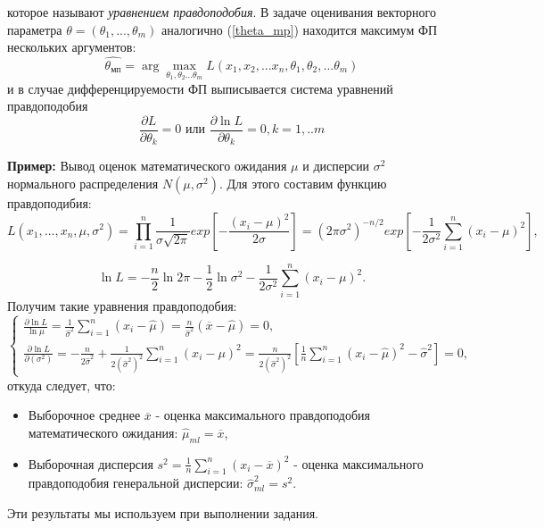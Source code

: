 \documentclass[../body.tex]{subfiles}
\begin{document}
которое называют \textit{уравнением правдоподобия}.
В задаче оценивания векторного параметра $\theta = (\theta_{1}, ... ,\theta_{m})$ аналогично (\ref{theta_mp}) находится максимум ФП нескольких аргументов: 
\begin{equation}
	\hat{\theta_{мп}} = \arg \max_{\theta_{1}, \theta_{2}...\theta_{m}} L(x_{1}, x_{2},...x_{n}, \theta_{1}, \theta_{2},...\theta_{m})
	\label{multi_theta}
\end{equation}
и в случае дифференцируемости ФП выписывается система уравнений правдоподобия
\begin{equation}
	\frac{\partial L}{\partial \theta_{k}} = 0 \text{  или  } \frac{\partial \ln L}{\partial \theta_{k}} = 0, k = 1,..m
\end{equation}

\textbf{Пример:} \label{normal} Вывод оценок математического ожидания $\mu$ и дисперсии $\sigma^2$ нормального распределения $N(\mu, \sigma^2)$.
Для этого составим функцию правдоподибия:
$$L(x_1, ..., x_n, \mu, \sigma^2) = \prod\limits_{i=1}^{n} \frac{1}{\sigma\sqrt{2\pi}}exp\left[-\frac{(x_i - \mu)^2}{2\sigma}\right] = (2\pi\sigma^2)^{-n/2}exp\left[-\frac{1}{2\sigma^2}\sum_{i = 1}^{n}(x_i - \mu)^2\right],$$

$$\ln L = -\frac{n}{2}\ln 2\pi - \frac{1}{2}\ln \sigma^2 - \frac{1}{2\sigma^2}\sum_{i = 1}^{n}(x_i - \mu)^2.$$
Получим такие уравнения правдоподобия:
$$
\begin{cases}
\frac{\partial\ln L}{\ln \mu} = \frac{1}{\hat{\sigma}^2} \sum_{i = 1}^{n}(x_i - \hat{\mu}) = \frac{n}{\hat{\sigma}^2}(\overline{x} - \hat{\mu}) = 0,\\
\frac{\partial \ln L}{\partial (\sigma^2)} = -\frac{n}{2\hat{\sigma}^2} + \frac{1}{2(\hat{\sigma}^2)^2}\sum_{i = 1}^{n}(x_i - \mu)^2 = \frac{n}{2(\hat{\sigma}^2)^2}\left[\frac{1}{n}\sum_{i = 1}^{n}(x_i - \hat{\mu})^2 - \hat{\sigma}^2\right] = 0,
\end{cases}
$$
откуда следует, что:
\begin{itemize}
	\item Выборочное среднее $\overline{x}$ - оценка максимального правдоподобия математического ожидания: $\hat{\mu}_{ml} = \overline{x}$,
	\item Выборочная дисперсия $s^2 = \frac{1}{n}\sum_{i = 1}^{n}(x_i - \overline{x})^2$ - оценка максимального правдоподобия генеральной дисперсии: $\hat{\sigma}_{ml}^2 = s^2$\cite[c.~442 - 444]{max}.
\end{itemize}
Эти результаты мы используем при выполнении задания.
\end{document}
